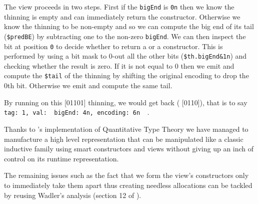 The view proceeds in two steps. First if the \texttt{bigEnd} is \texttt{0n}
then we know the thinning is empty and can immediately return the 
constructor.
%
Otherwise we know the thinning to be non-empty and so we can compute the big end
of its tail (\texttt{\$predBE}) by subtracting one to the non-zero \texttt{bigEnd}.
We can then inspect the bit at position \texttt{0} to decide whether to return a
 or a  constructor. This is performed by using a
bit mask to 0-out all the other bits (\texttt{\$th.bigEnd\&1n}) and checking whether
the result is zero.
%
If it is not equal to 0 then we emit  and compute the \texttt{\$tail}
of the thinning by shifting the original encoding to drop the 0th bit. Otherwise we
emit  and compute the same tail.

By running  on this [01101] thinning, we would get
back ( [0110]), that is to say
\texttt{{ tag: 1, val: { bigEnd: 4n, encoding: 6n } }}.

Thanks to \idris{}'s implementation of Quantitative Type Theory we have managed
to manufacture a high level representation that can be manipulated like a classic
inductive family using smart constructors and views without giving up an inch of
control on its runtime representation.

The remaining issues such as the fact that we form the view's constructors only
to immediately take them apart thus creating needless allocations can be tackled
by reusing Wadler's analysis (section 12 of \cite{DBLP:conf/popl/Wadler87}).
